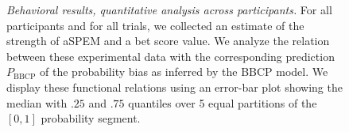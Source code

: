 \documentclass[12pt,english]{article}%
\newcommand{\seeFig}[1]{Figure~\ref{fig:#1}}
\begin{document}
\begin{figure}%
\caption{%
\emph{Behavioral results, quantitative analysis across participants.} %
For all participants and for all trials, we collected an estimate of
the strength of aSPEM and a bet score value.
We analyze the relation between these experimental data with the corresponding prediction $P_{\text{BBCP}}$
of the probability bias as inferred by the BBCP model.
We display these functional relations 
using an error-bar plot showing the median with $.25$ and $.75$ quantiles
over 5 equal partitions of the $[0, 1]$ probability segment.
}
\end{figure}
\end{document}
